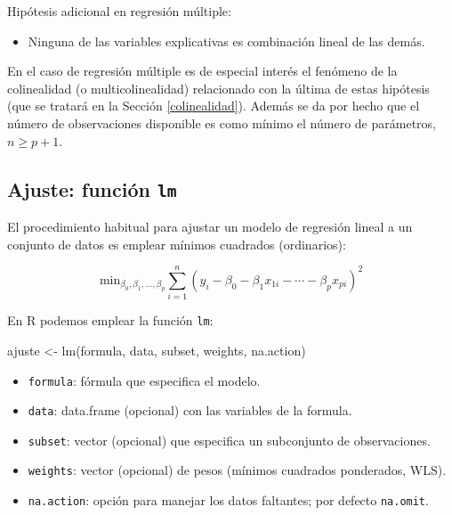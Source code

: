 \documentclass[
  spanish,
]{book}
\newenvironment{Shaded}{\begin{snugshade}}{\end{snugshade}}
\newcommand{\FunctionTok}[1]{\textcolor[rgb]{0.00,0.00,0.00}{#1}}
\newcommand{\NormalTok}[1]{#1}
\newcommand{\OtherTok}[1]{\textcolor[rgb]{0.56,0.35,0.01}{#1}}
\providecommand{\tightlist}{%
  \setlength{\itemsep}{0pt}\setlength{\parskip}{0pt}}
\theoremstyle{break}
\theoremstyle{definition}
\theoremstyle{definition}
\theoremstyle{definition}
\theoremstyle{definition}
\theoremstyle{remark}
\begin{document}
Hipótesis adicional en regresión múltiple:

\begin{itemize}
\tightlist
\item
  Ninguna de las variables explicativas es combinación lineal de las demás.
\end{itemize}

En el caso de regresión múltiple es de especial interés el fenómeno de la colinealidad (o multicolinealidad) relacionado con la última de estas hipótesis (que se tratará en la Sección \ref{colinealidad}).
Además se da por hecho que el número de observaciones disponible es como mínimo el número de parámetros, \(n \geq p + 1\).

\hypertarget{ajuste-funciuxf3n-lm}{%
\subsection{\texorpdfstring{Ajuste: función \texttt{lm}}{Ajuste: función lm}}\label{ajuste-funciuxf3n-lm}}

El procedimiento habitual para ajustar un modelo de regresión lineal a un conjunto de datos es emplear mínimos cuadrados (ordinarios):

\[\mbox{min}_{\beta_{0},\beta_{1},\ldots,\beta_{p}}  \sum\limits_{i=1}^{n}\left(  y_{i} - \beta_0 - \beta_1 x_{1i} - \cdots - \beta_p x_{pi} \right)^{2}\]

En R podemos emplear la función \texttt{lm}:

\begin{Shaded}
\begin{Highlighting}[]
\NormalTok{ajuste }\OtherTok{\textless{}{-}} \FunctionTok{lm}\NormalTok{(formula, data, subset, weights, na.action)}
\end{Highlighting}
\end{Shaded}

\begin{itemize}
\item
  \texttt{formula}: fórmula que especifica el modelo.
\item
  \texttt{data}: data.frame (opcional) con las variables de la formula.
\item
  \texttt{subset}: vector (opcional) que especifica un subconjunto de observaciones.
\item
  \texttt{weights}: vector (opcional) de pesos (mínimos cuadrados ponderados, WLS).
\item
  \texttt{na.action}: opción para manejar los datos faltantes; por defecto \texttt{na.omit}.
\end{itemize}
\end{document}
